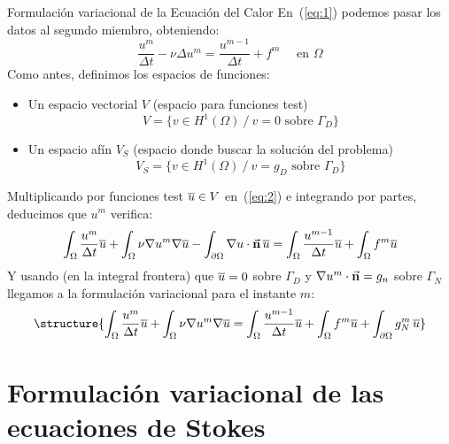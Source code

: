 \documentclass[9pt, dvipsnames,]{beamer}
\begin{document}
\begin{frame}{Formulación variacional de la Ecuación del Calor}
  \small
  En~(\ref{eq:1}) podemos pasar los datos al segundo miembro, obteniendo:
  \begin{equation}
    \label{eq:2}
     \frac{u^m}{\Delta t} - \nu\Delta u^m = \frac{u^{m-1}}{\Delta t} + f^m \quad\text{ en } \Omega
  \end{equation}
  Como antes, definimos los espacios de funciones:
  \begin{itemize}
  \item Un espacio vectorial $V$ (espacio para funciones test)
    $$ V = \{ v\in H^1(\Omega) \ / \ v=0 \text{ sobre } {\Gamma_D} \}$$
\item Un espacio afín $V_{S}$ (espacio donde buscar la solución del problema)
    $$ V_S = \{ v\in H^1(\Omega) \ / \ v=g_D \text{ sobre } {\Gamma_D} \}$$
  \end{itemize}
  Multiplicando por funciones test $\overline u\in V$ en~(\ref{eq:2}) e
  integrando por partes, deducimos que $u^m$ verifica:
  \begin{align*}
    \int_\Omega \frac{u^m}{\Delta t} \overline u + \int_\Omega \nu\nabla u^m \nabla \overline u
    - \int_{\partial\Omega} \nabla u \cdot \vec{\mathbf{n}} \,\overline u
    = \int_\Omega \frac{u^{m-1}}{\Delta t} \overline u + \int_\Omega f^m  \overline u
  \end{align*}
  Y usando (en la integral frontera) que $\overline u=0$ sobre $\Gamma_D$ y $\nabla u^m\cdot\vec{\mathbf{n}}=g_n$ sobre
  $\Gamma_N$ llegamos a la formulación variacional para el instante $m$:
  \begin{align*}
    \structure{
    \int_\Omega \frac{u^m}{\Delta t} \bu + \int_\Omega \nu\grad u^m \grad\bu
    = \int_\Omega \frac{u^{m-1}}{\Delta t} \bu + \int_\Omega f^m  \bu
    + \int_{\partial\Omega} g^m_N \,\bu
    }
  \end{align*}
\end{frame}



\section{Formulación variacional de las ecuaciones de Stokes}
\end{document}
